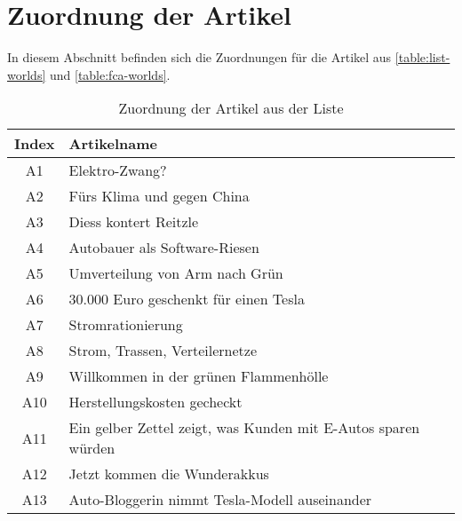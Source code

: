 \section{Zuordnung der Artikel}\label{appendix:article-match}
In diesem Abschnitt befinden sich die Zuordnungen für die Artikel aus \autoref{table:list-worlds} und \autoref{table:fca-worlds}.

\begin{table}[ht!]
    \centering
    \begin{tabular}{|c|l|}
        \hline
        \textbf{Index} & \textbf{Artikelname}                                          \\
        \hline
        A1             & Elektro-Zwang?                                                \\
        A2             & Fürs Klima und gegen China                                    \\
        A3             & Diess kontert Reitzle                                         \\
        A4             & Autobauer als Software-Riesen                                 \\
        A5             & Umverteilung von Arm nach Grün                                \\
        A6             & 30.000 Euro geschenkt für einen Tesla                         \\
        A7             & Stromrationierung                                             \\
        A8             & Strom, Trassen, Verteilernetze                                \\
        A9             & Willkommen in der grünen Flammenhölle                         \\
        A10            & Herstellungskosten gecheckt                                   \\
        A11            & Ein gelber Zettel zeigt, was Kunden mit E-Autos sparen würden \\
        A12            & Jetzt kommen die Wunderakkus                                  \\
        A13            & Auto-Bloggerin nimmt Tesla-Modell auseinander                 \\
        \hline
    \end{tabular}
    \caption{\label{table:list-match}Zuordnung der Artikel aus der Liste}
\end{table}

